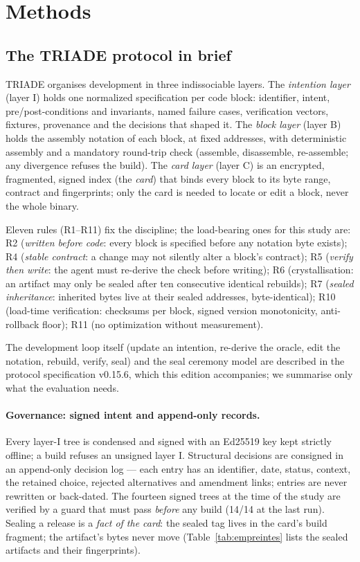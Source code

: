 \documentclass[11pt,a4paper]{article}
\begin{document}
\section{Methods}\label{sec:methods}

\subsection{The TRIADE protocol in brief}\label{sec:protocole}

TRIADE organises development in three indissociable layers. The
\emph{intention layer} (layer I) holds one normalized specification per
code block: identifier, intent, pre/post-conditions and invariants, named
failure cases, verification vectors, fixtures, provenance and the
decisions that shaped it. The \emph{block layer} (layer B) holds the
assembly notation of each block, at fixed addresses, with deterministic
assembly and a mandatory round-trip check (assemble, disassemble,
re-assemble; any divergence refuses the build). The \emph{card layer}
(layer C) is an encrypted, fragmented, signed index (the \emph{card}) that
binds every block to its byte range, contract and fingerprints; only the
card is needed to locate or edit a block, never the whole binary.

Eleven rules (R1--R11) fix the discipline; the load-bearing ones for this
study are: R2 (\emph{written before code}: every block is specified before
any notation byte exists); R4 (\emph{stable contract}: a change may not
silently alter a block's contract); R5 (\emph{verify then write}: the
agent must re-derive the check before writing); R6 (crystallisation: an
artifact may only be sealed after ten consecutive identical rebuilds);
R7 (\emph{sealed inheritance}: inherited bytes live at their sealed
addresses, byte-identical); R10 (load-time verification: checksums per
block, signed version monotonicity, anti-rollback floor); R11 (no
optimization without measurement).

The development loop itself (update an intention, re-derive the oracle,
edit the notation, rebuild, verify, seal) and the seal ceremony model are
described in the protocol specification v0.15.6, which this edition
accompanies; we summarise only what the evaluation needs.

\paragraph{Governance: signed intent and append-only records.}
Every layer-I tree is condensed and signed with an Ed25519 key kept
strictly offline; a build refuses an unsigned layer I. Structural
decisions are consigned in an append-only decision log --- each entry has
an identifier, date, status, context, the retained choice, rejected
alternatives and amendment links; entries are never rewritten or
back-dated. The fourteen signed trees at the time of the study are verified
by a guard that must pass \emph{before} any build (14/14 at the last
run). Sealing a release is a \emph{fact of the card}: the sealed tag
lives in the card's build fragment; the artifact's bytes never move
(Table~\ref{tab:empreintes} lists the sealed artifacts and their
fingerprints).
\end{document}

